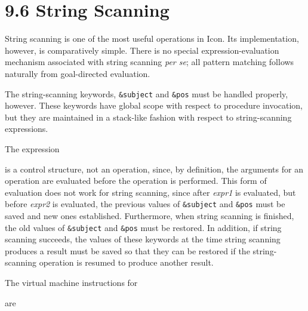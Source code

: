 \section[9.6 String Scanning]{9.6 String Scanning}

String scanning is one of the most useful operations in Icon. Its
implementation, however, is comparatively simple.  There is no special
expression-evaluation mechanism associated with string scanning
\textit{per se}; all {\textquotedbl}pattern matching{\textquotedbl}
follows naturally from goal-directed evaluation.

The string-scanning keywords, \texttt{\&subject} and \texttt{\&pos}
must be handled properly, however. These keywords have global scope
with respect to procedure invocation, but they are maintained in a
stack-like fashion with respect to string-scanning expressions.

The expression


\noindent is a control structure, not an operation, since, by
definition, the arguments for an operation are evaluated before the
operation is performed. This form of evaluation does not work for
string scanning, since after \textit{expr1} is evaluated, but before
\textit{expr2} is evaluated, the previous values of \texttt{\&subject}
and \texttt{\&pos} must be saved and new ones
established. Furthermore, when string scanning is finished, the old
values of \texttt{\&subject} and \texttt{\&pos} must be restored. In
addition, if string scanning succeeds, the values of these keywords at
the time string scanning produces a result must be saved so that they
can be restored if the string-scanning operation is resumed to produce
another result.

The virtual machine instructions for


are
\goodbreak
{}


